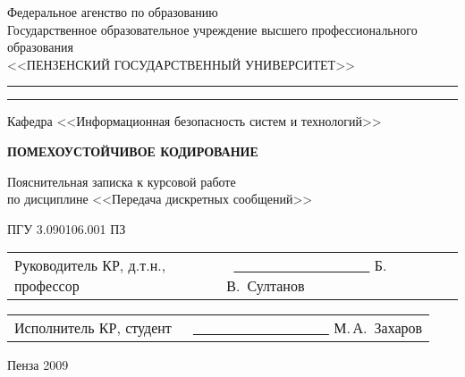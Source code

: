 \newpage
\begin{singlespace}
\begin{center}
Федеральное агенство по образованию  \\
Государственное образовательное учреждение высшего профессионального образования \\
\vspace{0.25cm}
<<ПЕНЗЕНСКИЙ ГОСУДАРСТВЕННЫЙ УНИВЕРСИТЕТ>> \\
\medskip 
    \hrule height 1pt
      \vskip 1pt 
      \hrule
      \vskip 3pt
Кафедра <<Информационная безопасность систем и технологий>>
\end{center}
\end{singlespace}

\vspace{8em}

\begin{center}
\textsc{\textbf{ПОМЕХОУСТОЙЧИВОЕ КОДИРОВАНИЕ}}
\end{center}

\begin{center}
  Пояснительная записка к курсовой работе \\
  по дисциплине <<Передача дискретных сообщений>>
\end{center}

\begin{center}
ПГУ 3.090106.001 ПЗ
\end{center}

\vspace{6em}
  \begin{tabular}{p{60mm}p{80mm}}
    Руководитель КР, \newline
    д.т.н., профессор
   &
    ~\newline\underline{~~~~~~~~~~~~~~~~~~~} Б.\,В.~Султанов \newline
  \end{tabular}
  
   \begin{tabular}{p{60mm}p{80mm}}
    Исполнитель КР, \newline
    студент
   &
    ~\newline\underline{~~~~~~~~~~~~~~~~~~~} М.\,А.~Захаров \newline
  \end{tabular}

\vspace{\fill}
\begin{center}
Пенза 2009 
\end{center}
\newpage

